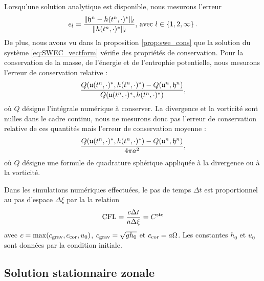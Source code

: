 Lorsqu'une solution analytique est disponible, nous mesurons l'erreur
\begin{equation}
e_l = \dfrac{\| \mathfrak{h}^n - h(t^n,\cdot)^* \|_l}{\| h(t^n,\cdot)^* \|_l} \text{, avec } l \in \left\lbrace 1, 2, \infty \right\rbrace.
\end{equation}
De plus, nous avons vu dans la proposition \ref{prop:swe_cons} que la solution du système \eqref{eq:SWEC_vectform} vérifie des propriétés de conservation. Pour la conservation de la masse, de l'énergie et de l'entrophie potentielle, nous mesurons l'erreur de conservation relative :
\begin{equation}
\dfrac{Q(\mathfrak{u}(t^n,\cdot)^*, h(t^n,\cdot)^*) - Q(\mathfrak{u}^n, \mathfrak{h}^n)}{Q(\mathfrak{u}(t^n,\cdot)^*, h(t^n,\cdot)^*)},
\end{equation}
où $Q$ désigne l'intégrale numérique à conserver.
La divergence et la vorticité sont nulles dans le cadre continu, nous ne mesurons donc pas l'erreur de conservation relative de ces quantités mais l'erreur de conservation moyenne :
\begin{equation}
\dfrac{Q(\mathfrak{u}(t^n,\cdot)^*, h(t^n,\cdot)^*) - Q(\mathfrak{u}^n, \mathfrak{h}^n)}{4 \pi a^2},
\end{equation}
où $Q$ désigne une formule de quadrature sphérique appliquée à la divergence ou à la vorticité.

Dans les simulations numériques effectuées, le pas de temps $\Delta t$ est proportionnel au pas d'espace $\Delta \xi$ par la la relation
\begin{equation}
\text{CFL} = \dfrac{c \Delta t}{a \Delta \xi} = C^{\text{ste}}
\end{equation}
avec $c = \max (c_{\text{grav}}, c_{\text{cor}}, u_0)$, $c_{\text{grav}} = \sqrt{gh_0}$ et $c_{\text{cor}} = a \Omega$. Les constantes $h_0$ et $u_0$ sont données par la condition initiale.






















\subsection{Solution stationnaire zonale}

